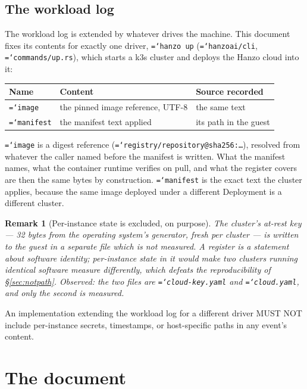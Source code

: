 \documentclass[11pt,a4paper]{article}
\newtheorem{remark}[definition]{Remark}
\newcommand{\code}[1]{\texttt{\hyphenchar\font=`\-\relax #1}}
\begin{document}
\subsection{The workload log}

The workload log is extended by whatever drives the machine. This document fixes
its contents for exactly one driver, \code{hanzo up} (\code{hanzoai/cli},
\code{commands/up.rs}), which starts a k3s cluster and deploys the Hanzo cloud
into it:

\begin{center}
\begin{tabular}{@{}lll@{}}
\toprule
Name & Content & Source recorded \\
\midrule
\code{image}    & the pinned image reference, UTF-8 & the same text \\
\code{manifest} & the manifest text applied         & its path in the guest \\
\bottomrule
\end{tabular}
\end{center}

\code{image} is a digest reference (\code{registry/repository@sha256:\dots}),
resolved from whatever the caller named before the manifest is written. What the
manifest names, what the container runtime verifies on pull, and what the register
covers are then the same bytes by construction. \code{manifest} is the exact text
the cluster applies, because the same image deployed under a different Deployment
is a different cluster.

\begin{remark}[Per-instance state is excluded, on purpose]
The cluster's at-rest key --- 32 bytes from the operating system's generator, fresh
per cluster --- is written to the guest in a \emph{separate} file which is not
measured. A register is a statement about software identity; per-instance state in
it would make two clusters running identical software measure differently, which
defeats the reproducibility of \S\ref{sec:notpath}. \emph{Observed}: the two files
are \code{cloud-key.yaml} and \code{cloud.yaml}, and only the second is measured.
\end{remark}

An implementation extending the workload log for a different driver MUST NOT
include per-instance secrets, timestamps, or host-specific paths in any event's
content.

\section{The document}
\label{sec:document}
\end{document}
